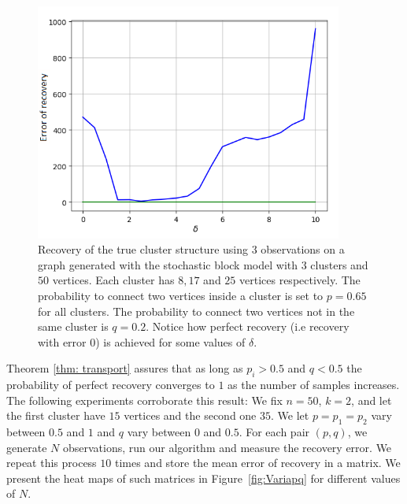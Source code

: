 \documentclass[12pt]{amsart}
\theoremstyle{remark}
\begin{document}
\begin{figure}[H]
\centering
\includegraphics[width=0.9\textwidth]{./Pictures/ErrorRecoveryOK.PNG}
\caption{\small{Recovery of the true cluster structure using $3$ observations on a graph generated with the stochastic block model with $3$ clusters and $50$ vertices. Each cluster has $8,17$ and $25$ vertices respectively. The probability to connect two vertices inside a cluster is set to $p=0.65$ for all clusters. The probability to connect two vertices not in the same cluster is $q=0.2$. Notice how perfect recovery (i.e recovery with error $0$) is achieved for some values of $\delta$. }}
 \label{fig:errorRecovery}
\end{figure}




Theorem \ref{thm: transport} assures that as long as $p_i > 0.5$ and $q< 0.5$ the probability of perfect recovery converges to $1$ as the number of samples increases. The following experiments corroborate this result:
We fix $n=50$, $k=2$, and let the first cluster have $15$ vertices and the second one $35$. We let $p =  p_1 = p_2$ vary between $0.5$ and $1$ and $q$ vary between $0$ and $0.5$.  For each pair $(p,q)$, we generate $N$ observations, run our algorithm and measure the recovery error. We repeat this process $10$ times and store the mean error of recovery in a matrix.
We present the heat maps of such matrices in Figure~\ref{fig:Variapq} for different values of $N$. 
\end{document}
